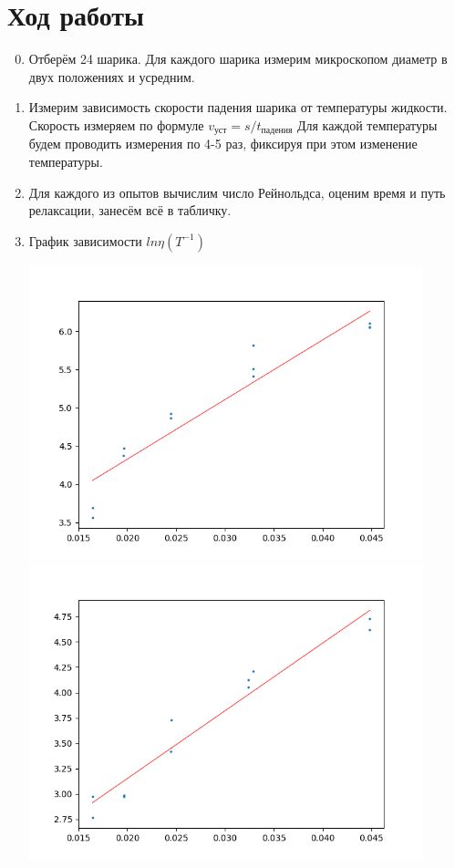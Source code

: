 \documentclass[11pt,a4paper]{article}
\begin{document}
\section*{Ход работы}
\begin{enumerate}
  \setcounter{enumi}{-1}
  \item Отберём 24 шарика. Для каждого шарика измерим микроскопом
  диаметр в двух положениях и усредним.
  \item Измерим зависимость скорости падения шарика от температуры жидкости.
  Скорость измеряем по формуле $v_\text{уст} = s / t_\text{падения}$
  Для каждой температуры будем проводить измерения по 4-5 раз, фиксируя при этом изменение температуры.
  \item Для каждого из опытов вычислим число Рейнольдса, оценим время и путь релаксации,
  занесём всё в табличку.
  \item График зависимости $ln \eta  (T^{-1})$
  \begin{center}
    \includegraphics[width=0.9\textwidth]{graph steel.png}
    \includegraphics[width=0.9\textwidth]{graph glass.png}

\end{center}
\end{enumerate}
\end{document}
